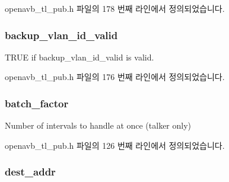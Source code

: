 openavb\+\_\+tl\+\_\+pub.\+h 파일의 178 번째 라인에서 정의되었습니다.

\subsubsection[{\texorpdfstring{backup\+\_\+vlan\+\_\+id\+\_\+valid}{backup_vlan_id_valid}}]{ backup\+\_\+vlan\+\_\+id\+\_\+valid}\hypertarget{structopenavb__tl__cfg__t_af6370c811960994878315500dbdf5724}{}\label{structopenavb__tl__cfg__t_af6370c811960994878315500dbdf5724}


T\+R\+UE if backup\+\_\+vlan\+\_\+id\+\_\+valid is valid. 



openavb\+\_\+tl\+\_\+pub.\+h 파일의 176 번째 라인에서 정의되었습니다.

\subsubsection[{\texorpdfstring{batch\+\_\+factor}{batch_factor}}]{ batch\+\_\+factor}\hypertarget{structopenavb__tl__cfg__t_a9db3c945c8e429a9ca8e13db38447d3c}{}\label{structopenavb__tl__cfg__t_a9db3c945c8e429a9ca8e13db38447d3c}


Number of intervals to handle at once (talker only) 



openavb\+\_\+tl\+\_\+pub.\+h 파일의 126 번째 라인에서 정의되었습니다.

\subsubsection[{\texorpdfstring{dest\+\_\+addr}{dest_addr}}]{ dest\+\_\+addr}\hypertarget{structopenavb__tl__cfg__t_adafdd018fad617237267247e6680f87a}{}\label{structopenavb__tl__cfg__t_adafdd018fad617237267247e6680f87a}


